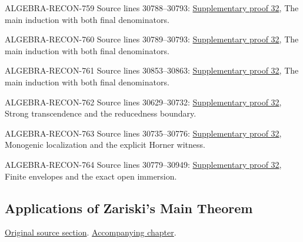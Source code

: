 \begin{AlgebraSourceRoutes}
\item[ALGEBRA-RECON-759] Source lines 30788--30793: \hyperlink{algebra_zariski_main_notes_20260928}{Supplementary proof 32}, The main induction with both final denominators.
\item[ALGEBRA-RECON-760] Source lines 30789--30793: \hyperlink{algebra_zariski_main_notes_20260928}{Supplementary proof 32}, The main induction with both final denominators.
\item[ALGEBRA-RECON-761] Source lines 30853--30863: \hyperlink{algebra_zariski_main_notes_20260928}{Supplementary proof 32}, The main induction with both final denominators.
\item[ALGEBRA-RECON-762] Source lines 30629--30732: \hyperlink{algebra_zariski_main_notes_20260928}{Supplementary proof 32}, Strong transcendence and the reducedness boundary.
\item[ALGEBRA-RECON-763] Source lines 30735--30776: \hyperlink{algebra_zariski_main_notes_20260928}{Supplementary proof 32}, Monogenic localization and the explicit Horner witness.
\item[ALGEBRA-RECON-764] Source lines 30779--30949: \hyperlink{algebra_zariski_main_notes_20260928}{Supplementary proof 32}, Finite envelopes and the exact open immersion.
\end{AlgebraSourceRoutes}

\subsection{Applications of Zariski's Main Theorem}
\hypertarget{algebra-source-section-apply-main-theorem}{}
\noindent\href{https://github.com/stacks/stacks-project/blob/a04446e57ec1fbc252a871afcec7752fb2807b14/algebra.tex\#L30954}{Original source section}. \href{algebra.pdf\#nameddest=section-apply-main-theorem}{Accompanying chapter}.

